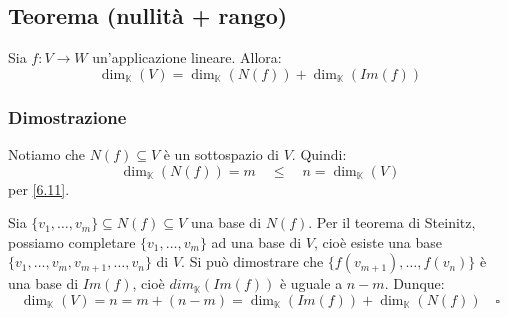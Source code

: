 \documentclass[a4paper]{article}
\theoremstyle{break}
\theoremstyle{break}
\theoremstyle{break}
\theoremstyle{break}
\begin{document}
\subsection{Teorema (nullità + rango)}
Sia \( f: V \to W \) un'applicazione lineare. Allora:
\[
  \dim_{\mathbb{K}}(V) = \dim_{\mathbb{K}}(N(f)) + \dim_{\mathbb{K}}(Im(f))
\] 

\subsubsection{Dimostrazione}
Notiamo che \( N(f) \subseteq V \) è un sottospazio di \( V \). Quindi:
\[
  \dim_{\mathbb{K}}(N(f)) = m \quad \le \quad n = \dim_{\mathbb{K}}(V)
\] 
per \ref{6.11}.

\noindent Sia \( \{v_1, \ldots, v_m\} \subseteq N(f) \subseteq V  \) una base di \( N(f) \).
Per il teorema di Steinitz, possiamo completare \( \{v_1, \ldots, v_m\} \) ad una base
di \( V \), cioè esiste una base \( \{v_1, \ldots, v_m, v_{m+1}, \ldots, v_n\} \) di \( V \).
Si può dimostrare che \( \{f(v_{m+1}), \ldots, f(v_n)\} \) è una base di \( Im(f) \),
cioè \( dim_{\mathbb{K}}(Im(f)) \) è uguale a \( n - m \). Dunque:
\[
  \dim_{\mathbb{K}}(V) = n = m + (n - m) =  \dim_{\mathbb{K}}(Im(f)) + \dim_{\mathbb{K}}(N(f)) \quad \square
\] 
\end{document}
